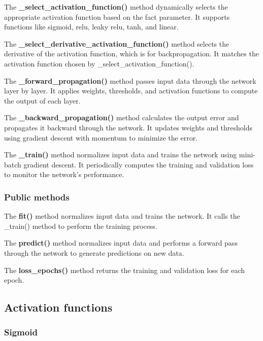 \documentclass[11pt, a4paper]{article}
\begin{document}
The \textbf{\_select\_activation\_function()} method dynamically selects the appropriate activation function based on the fact parameter. It supports functions like 
sigmoid, relu, leaky relu, tanh, and linear.

\vspace{1em}The \textbf{\_select\_derivative\_activation\_function()} method selects the derivative of the activation function, which is for backpropagation. 
It matches the activation function chosen by \_select\_activation\_function().

\vspace{1em}The \textbf{\_forward\_propagation()} method passes input data through the network layer by layer. It applies weights, thresholds, and activation functions 
to compute the output of each layer.

\vspace{1em}The \textbf{\_backward\_propagation()} method calculates the output error and propagates it backward through the network. It updates weights and thresholds 
using gradient descent with momentum to minimize the error.

\vspace{1em}The \textbf{\_train()} method normalizes input data and trains the network using mini-batch gradient descent. It periodically computes the training and 
validation loss to monitor the network's performance.

\subsubsection{Public methods}

The \textbf{fit()} method normalizes input data and trains the network. It calls the \_train() method to perform the training process.

\vspace{1em}The \textbf{predict()} method normalizes input data and performs a forward pass through the network to generate predictions on new data.

\vspace{1em}The \textbf{loss\_epochs()} method returns the training and validation loss for each epoch.

\subsection{Activation functions}

\subsubsection{Sigmoid}
\end{document}
